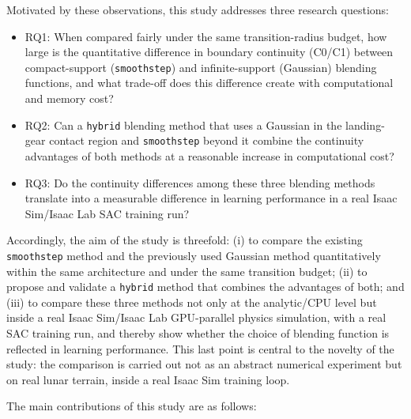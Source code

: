 Motivated by these observations, this study addresses three research questions:

\begin{itemize}
  \item RQ1: When compared fairly under the same transition-radius budget, how large is the quantitative difference in boundary continuity (C0/C1) between compact-support (\texttt{smoothstep}) and infinite-support (Gaussian) blending functions, and what trade-off does this difference create with computational and memory cost?
  \item RQ2: Can a \texttt{hybrid} blending method that uses a Gaussian in the landing-gear contact region and \texttt{smoothstep} beyond it combine the continuity advantages of both methods at a reasonable increase in computational cost?
  \item RQ3: Do the continuity differences among these three blending methods translate into a measurable difference in learning performance in a real Isaac Sim/Isaac Lab SAC training run?
\end{itemize}

Accordingly, the aim of the study is threefold: (i) to compare the existing \texttt{smoothstep} method and the previously used Gaussian method quantitatively within the same architecture and under the same transition budget; (ii) to propose and validate a \texttt{hybrid} method that combines the advantages of both; and (iii) to compare these three methods not only at the analytic/CPU level but inside a real Isaac Sim/Isaac Lab GPU-parallel physics simulation, with a real SAC training run, and thereby show whether the choice of blending function is reflected in learning performance. This last point is central to the novelty of the study: the comparison is carried out not as an abstract numerical experiment but on real lunar terrain, inside a real Isaac Sim training loop.

The main contributions of this study are as follows:

